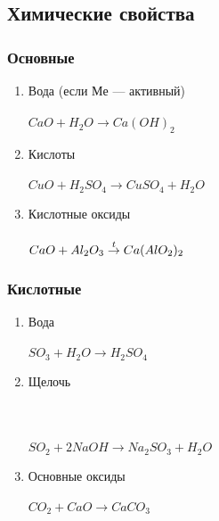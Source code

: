 \subsection{Химические свойства}
\subsubsection{Основные}
\begin{enumerate}
    \item Вода (если $Ме$ --- активный)\\
        \\
        $CaO + H_2O \rightarrow Ca(OH)_2$

    \item Кислоты\\
        \\
        $CuO + H_2SO_4 \rightarrow CuSO_4 + H_2O$

    \item Кислотные оксиды\\
        \\
        $CaO + Al_2O_3 \stackrel{t}{\rightarrow} Ca(AlO_2)_2$

\end{enumerate}


\subsubsection{Кислотные}
\begin{enumerate}
    \item Вода\\
        \\
        $SO_3 + H_2O \rightarrow H_2SO_4$

    \item Щелочь\\
        \\
        \\
        \\
        $SO_2 + 2NaOH \rightarrow Na_2SO_3 + H_2O$

    \item Основные оксиды\\
        \\
        $CO_2 + CaO \rightarrow CaCO_3$
\end{enumerate}
